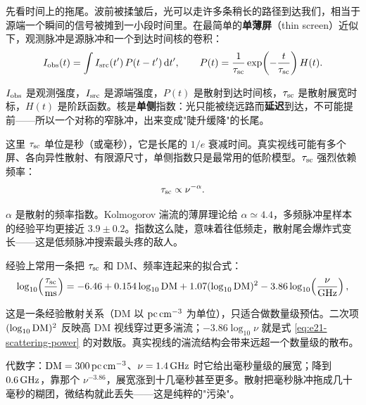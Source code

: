 先看时间上的拖尾。波前被揉皱后，光可以走许多条稍长的路径到达我们，相当于源端一个瞬间的信号被摊到一小段时间里。在最简单的\textbf{单薄屏}（thin screen）近似下，观测脉冲是源脉冲和一个到达时间核的卷积：
\begin{equation}
  I_{\rm obs}(t)
  =
  \int I_{\rm src}(t')\,P(t-t')\,{\rm d}t',
  \qquad
  P(t)=\frac{1}{\tau_{\rm sc}}\exp\!\left(-\frac{t}{\tau_{\rm sc}}\right)H(t).
  \label{eq:e21-scattering-convolution}
\end{equation}
\begin{formulaexplain}
\(I_{\rm obs}\) 是观测强度，\(I_{\rm src}\) 是源端强度，\(P(t)\) 是散射到达时间核，\(\tau_{\rm sc}\) 是散射展宽时标，\(H(t)\) 是阶跃函数。核是\textbf{单侧}指数：光只能被绕远路而\textbf{延迟}到达，不可能提前——所以一个对称的窄脉冲，出来变成"陡升缓降"的长尾。
\end{formulaexplain}
这里 \(\tau_{\rm sc}\) 单位是秒（或毫秒），它是长尾的 \(1/e\) 衰减时间。真实视线可能有多个屏、各向异性散射、有限源尺寸，单侧指数只是最常用的低阶模型。\(\tau_{\rm sc}\) 强烈依赖频率：
\begin{equation}
  \tau_{\rm sc}\propto \nu^{-\alpha}.
  \label{eq:e21-scattering-power}
\end{equation}
\begin{formulaexplain}
\(\alpha\) 是散射的频率指数。Kolmogorov 湍流的薄屏理论给 \(\alpha\simeq4.4\)，多频脉冲星样本的经验平均更接近 \(3.9\pm0.2\)。指数这么陡，意味着往低频走，散射尾会爆炸式变长——这是低频脉冲搜索最头疼的敌人。
\end{formulaexplain}
经验上常用一条把 \(\tau_{\rm sc}\) 和 DM、频率连起来的拟合式：
\begin{equation}
  \log_{10}\!\left(\frac{\tau_{\rm sc}}{{\rm ms}}\right)
  =
  -6.46
  +0.154\log_{10}{\rm DM}
  +1.07(\log_{10}{\rm DM})^2
  -3.86\log_{10}\!\left(\frac{\nu}{\rm GHz}\right),
  \label{eq:e21-bhat-scattering}
\end{equation}
\begin{formulaexplain}
这是一条经验散射关系（DM 以 \({\rm pc\,cm^{-3}}\) 为单位），只适合做数量级预估。二次项 \((\log_{10}{\rm DM})^2\) 反映高 DM 视线穿过更多湍流；\(-3.86\log_{10}\nu\) 就是式 \eqref{eq:e21-scattering-power} 的对数版。真实视线的湍流结构会带来远超一个数量级的散布。
\end{formulaexplain}
代数字：\({\rm DM}=300\,{\rm pc\,cm^{-3}}\)、\(\nu=1.4\,{\rm GHz}\) 时它给出毫秒量级的展宽；降到 \(0.6\,{\rm GHz}\)，靠那个 \(\nu^{-3.86}\)，展宽涨到十几毫秒甚至更多。散射把毫秒脉冲拖成几十毫秒的糊团，微结构就此丢失——这是纯粹的"污染"。

